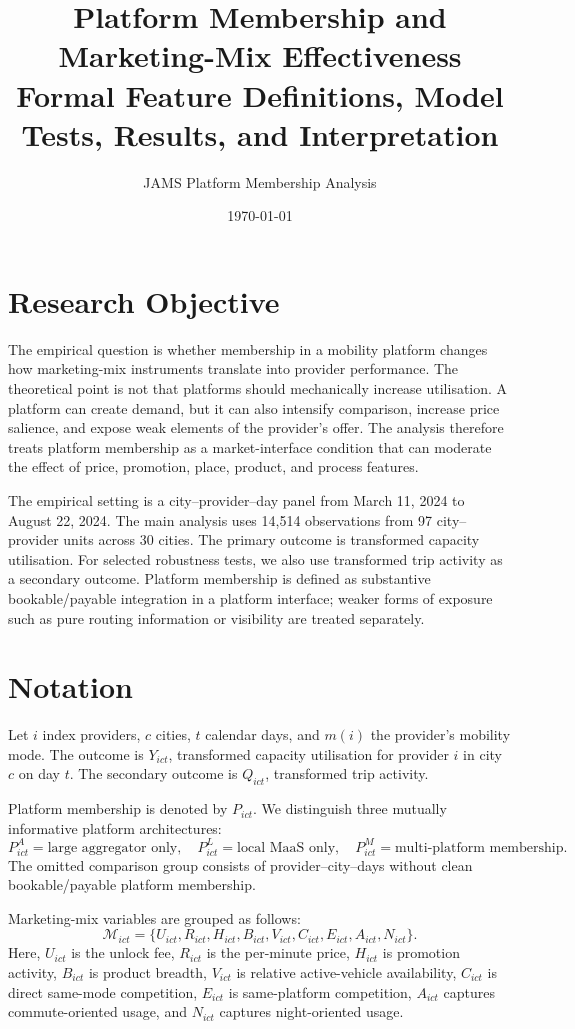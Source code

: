 \documentclass[11pt]{article}
\title{Platform Membership and Marketing-Mix Effectiveness\\
\large Formal Feature Definitions, Model Tests, Results, and Interpretation}
\author{JAMS Platform Membership Analysis}
\date{\today}
\begin{document}
\maketitle

\section{Research Objective}

The empirical question is whether membership in a mobility platform changes how
marketing-mix instruments translate into provider performance. The theoretical point is
not that platforms should mechanically increase utilisation. A platform can create demand,
but it can also intensify comparison, increase price salience, and expose weak elements of
the provider's offer. The analysis therefore treats platform membership as a market-interface
condition that can moderate the effect of price, promotion, place, product, and process
features.

The empirical setting is a city--provider--day panel from March 11, 2024 to August 22,
2024. The main analysis uses 14,514 observations from 97 city--provider units across 30
cities. The primary outcome is transformed capacity utilisation. For selected robustness
tests, we also use transformed trip activity as a secondary outcome. Platform membership is
defined as substantive bookable/payable integration in a platform interface; weaker forms
of exposure such as pure routing information or visibility are treated separately.

\section{Notation}

Let $i$ index providers, $c$ cities, $t$ calendar days, and $m(i)$ the provider's mobility
mode. The outcome is $Y_{ict}$, transformed capacity utilisation for provider $i$ in city
$c$ on day $t$. The secondary outcome is $Q_{ict}$, transformed trip activity.

Platform membership is denoted by $P_{ict}$. We distinguish three mutually informative
platform architectures:
\[
P^{A}_{ict}=\text{large aggregator only}, \quad
P^{L}_{ict}=\text{local MaaS only}, \quad
P^{M}_{ict}=\text{multi-platform membership}.
\]
The omitted comparison group consists of provider--city--days without clean bookable/payable
platform membership.

Marketing-mix variables are grouped as follows:
\[
\mathcal{M}_{ict}=\{U_{ict}, R_{ict}, H_{ict}, B_{ict}, V_{ict}, C_{ict}, E_{ict}, A_{ict}, N_{ict}\}.
\]
Here, $U_{ict}$ is the unlock fee, $R_{ict}$ is the per-minute price, $H_{ict}$ is promotion
activity, $B_{ict}$ is product breadth, $V_{ict}$ is relative active-vehicle availability,
$C_{ict}$ is direct same-mode competition, $E_{ict}$ is same-platform competition, $A_{ict}$
captures commute-oriented usage, and $N_{ict}$ captures night-oriented usage.
\end{document}
